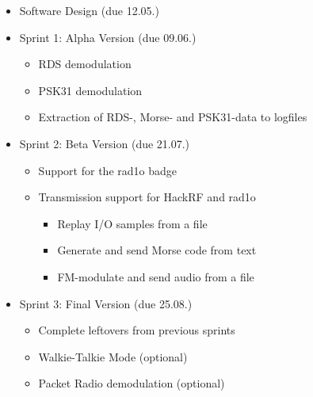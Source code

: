 \begin{itemize}
	\item Software Design (due 12.05.)
	\item Sprint 1: Alpha Version (due 09.06.)
	\begin{itemize}
		\item \ac{RDS} demodulation
		\item \ac{PSK31} demodulation
		\item Extraction of \ac{RDS}-, Morse- and \ac{PSK31}-data to logfiles
	\end{itemize}
	\item Sprint 2: Beta Version (due 21.07.)
	\begin{itemize}
		\item Support for the rad1o badge
		\item Transmission support for HackRF and rad1o
		\begin{itemize}
			\item Replay I/O samples from a file
			\item Generate and send Morse code from text
			\item FM-modulate and send audio from a file
		\end{itemize}
	\end{itemize}
	\item Sprint 3: Final Version (due 25.08.)
	\begin{itemize}
		\item Complete leftovers from previous sprints
		\item Walkie-Talkie Mode (optional)
		\item Packet Radio demodulation (optional)
	\end{itemize}
\end{itemize}
